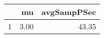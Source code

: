 \begin{table}[h]
\centering
\begin{tabular}{rrr}
  \hline
 & mu & avgSampPSec \\ 
  \hline
1 & 3.00 & 43.35 \\ 
   \hline
\end{tabular}
\end{table}
